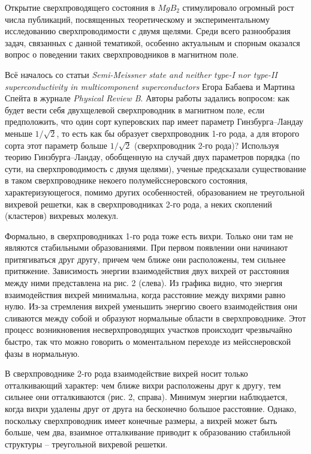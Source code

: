 Открытие сверхпроводящего состояния в \( MgB_2 \) стимулировало огромный рост 
числа публикаций, посвященных теоретическому и экспериментальному исследованию 
сверхпроводимости с двумя щелями. Среди всего разнообразия задач, связанных с 
данной тематикой, особенно актуальным и спорным оказался вопрос о поведении 
таких сверхпроводников в магнитном поле.

Всё началось со статьи \emph{Semi-Meissner state and neither type-I nor 
type-II superconductivity in multicomponent superconductors} Егора Бабаева и 
Мартина Спейта в журнале \emph{Physical Review B}. Авторы работы задались 
вопросом: как будет вести себя двухщелевой сверхпроводник в магнитном поле, 
если предположить, что один сорт куперовских пар имеет параметр 
Гинзбурга–Ландау меньше \( 1/\sqrt{2} \), то есть как бы образует 
сверхпроводник 1-го рода, а для второго сорта этот параметр больше 
\( 1/\sqrt{2} \) (сверхпроводник 2-го рода)? Используя теорию 
Гинзбурга–Ландау, обобщенную на случай двух параметров порядка (по сути, 
на сверхпроводимость с двумя щелями), ученые предсказали существование в 
таком сверхпроводнике некоего полумейсснеровского состояния, 
характеризующегося, помимо других особенностей, образованием не треугольной 
вихревой решетки, как в сверхпроводниках 2-го рода, а неких скоплений 
(кластеров) вихревых молекул.

Формально, в сверхпроводниках 1-го рода тоже есть вихри. Только они там не 
являются стабильными образованиями. При первом появлении они начинают 
притягиваться друг другу, причем чем ближе они расположены, тем сильнее 
притяжение. Зависимость энергии взаимодействия двух вихрей от расстояния между 
ними представлена на рис. 2 (слева). Из графика видно, что энергия 
взаимодействия вихрей минимальна, когда расстояние между вихрями равно нулю. 
Из-за стремления вихрей уменьшить энергию своего взаимодействия они сливаются 
между собой и образуют нормальные области в сверхпроводнике. Этот процесс 
возникновения несверхпроводящих участков происходит чрезвычайно быстро, так 
что можно говорить о моментальном переходе из мейсснеровской фазы в нормальную.

В сверхпроводнике 2-го рода взаимодействие вихрей носит только отталкивающий 
характер: чем ближе вихри расположены друг к другу, тем сильнее они 
отталкиваются (рис. 2, справа). Минимум энергии наблюдается, когда вихри 
удалены друг от друга на бесконечно большое расстояние. Однако, поскольку 
сверхпроводник имеет конечные размеры, а вихрей может быть больше, чем два, 
взаимное отталкивание приводит к образованию стабильной структуры -- 
треугольной вихревой решетки.

